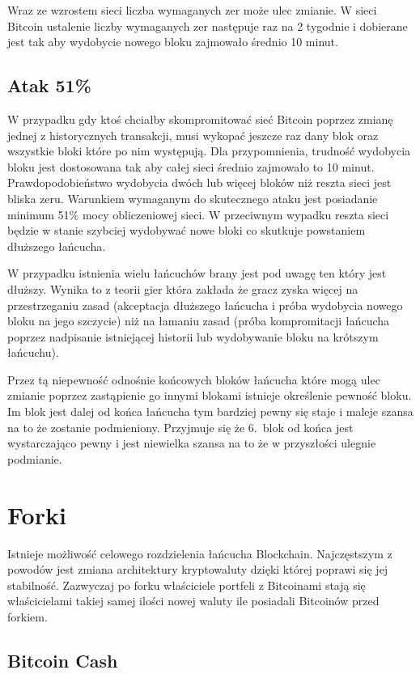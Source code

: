 \documentclass[conference]{IEEEtran}
\begin{document}
Wraz ze wzrostem sieci liczba wymaganych zer może ulec zmianie. W sieci Bitcoin ustalenie liczby wymaganych zer
następuje raz na 2 tygodnie i dobierane jest tak aby wydobycie nowego bloku zajmowało średnio 10 minut.

\subsection{Atak 51\%}

W przypadku gdy ktoś chciałby skompromitować sieć Bitcoin poprzez zmianę jednej z historycznych transakcji, musi wykopać
jeszcze raz dany blok oraz wszystkie bloki które po nim występują. Dla przypomnienia, trudność wydobycia bloku jest
dostosowana tak aby całej sieci średnio zajmowało to 10 minut. Prawdopodobieństwo wydobycia dwóch lub więcej bloków niż
reszta sieci jest bliska zeru. Warunkiem wymaganym do skutecznego ataku jest posiadanie minimum 51\% mocy obliczeniowej
sieci. W przeciwnym wypadku reszta sieci będzie w stanie szybciej wydobywać nowe bloki co skutkuje powstaniem dłuższego
łańcucha.

W przypadku istnienia wielu łańcuchów brany jest pod uwagę ten który jest dłuższy. Wynika to z teorii gier która zakłada
że gracz zyska więcej na przestrzeganiu zasad (akceptacja dłuższego łańcucha i próba wydobycia nowego bloku na jego
szczycie) niż na łamaniu zasad (próba kompromitacji łańcucha poprzez nadpisanie istniejącej historii lub wydobywanie
bloku na krótszym łańcuchu).

Przez tą niepewność odnośnie końcowych bloków łańcucha które mogą ulec zmianie poprzez zastąpienie go innymi blokami
istnieje określenie pewność bloku. Im blok jest dalej od końca łańcucha tym bardziej pewny się staje i maleje szansa na
to że zostanie podmieniony. Przyjmuje się że 6.\ blok od końca jest wystarczająco pewny i jest niewielka szansa na to że
w przyszłości ulegnie podmianie.

\section{Forki}

Istnieje możliwość celowego rozdzielenia łańcucha Blockchain. Najczęstszym z powodów jest zmiana architektury
kryptowaluty dzięki której poprawi się jej stabilność. Zazwyczaj po forku właściciele portfeli z Bitcoinami stają się
właścicielami takiej samej ilości nowej waluty ile posiadali Bitcoinów przed forkiem.

\subsection{Bitcoin Cash}
\end{document}
